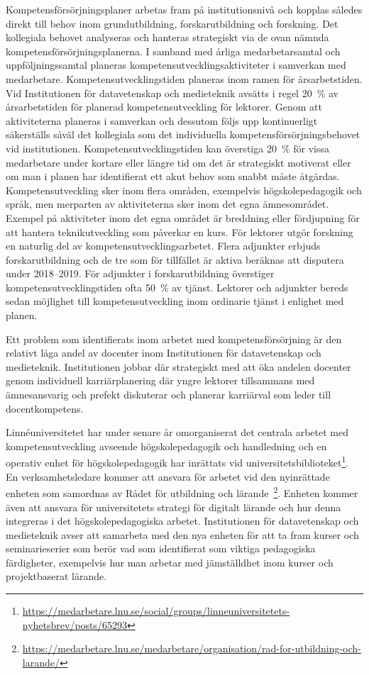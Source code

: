 Kompetensförsörjningsplaner arbetas fram på institutionsnivå och kopplas således direkt till behov inom grundutbildning, forskarutbildning och forskning. Det kollegiala behovet analyseras och hanteras strategiskt via de ovan nämnda kompetensförsörjningsplanerna. I samband med årliga medarbetarsamtal och uppföljningssamtal planeras kompetensutvecklingsaktiviteter i samverkan med medarbetare. Kompetensutvecklingstiden planeras inom ramen för årsarbetstiden. Vid Institutionen för datavetenskap och medieteknik avsätts i regel 20~\% av årsarbetstiden för planerad kompetensutveckling för lektorer. Genom att aktiviteterna planeras i samverkan och dessutom följs upp kontinuerligt säkerställs såväl det kollegiala som det individuella kompetensförsörjningsbehovet vid institutionen. Kompetensutvecklingstiden kan överstiga 20~\% för vissa medarbetare under kortare eller längre tid om det är strategiskt motiverat eller om man i planen har identifierat ett akut behov som snabbt måste åtgärdas. Kompetensutveckling sker inom flera områden, exempelvis högskolepedagogik och språk, men merparten av aktiviteterna sker inom det egna ämnesområdet. Exempel på aktiviteter inom det egna området är breddning eller fördjupning för att hantera teknikutveckling som påverkar en kurs. För lektorer utgör forskning en naturlig del av kompetensutvecklingsarbetet. Flera adjunkter erbjuds forskarutbildning och de tre som för tillfället är aktiva beräknas att disputera under 2018–2019. För adjunkter i forskarutbildning överstiger kompetensutvecklingstiden ofta 50~\% av tjänst. Lektorer och adjunkter bereds sedan möjlighet till kompetensutveckling inom ordinarie tjänst i enlighet med planen.

Ett problem som identifierats inom arbetet med kompetensförsörjning är den relativt låga andel av docenter inom Institutionen för datavetenskap och medieteknik. Institutionen jobbar där strategiskt med att öka andelen docenter genom individuell karriärplanering där yngre lektorer tillsammans med ämnesansvarig och prefekt diskuterar och planerar karriärval som leder till docentkompetens.

Linnéuniversitetet har under senare år omorganiserat det centrala arbetet med kompetensutveckling avseende högskolepedagogik och handledning och en operativ enhet för högskolepedagogik har inrättats vid universitetsbiblioteket\footnote{\url{https://medarbetare.lnu.se/social/groups/linneuniversitetets-nyhetsbrev/posts/65293}}. En verksamhetsledare kommer att ansvara för arbetet vid den nyinrättade enheten som samordnas av Rådet för utbildning och lärande~\footnote{\url{https://medarbetare.lnu.se/medarbetare/organisation/rad-for-utbildning-och-larande/}}. Enheten kommer även att ansvara för universitetets strategi för digitalt lärande och hur denna integreras i det högskolepedagogiska arbetet. Institutionen för datavetenskap och medieteknik avser att samarbeta med den nya enheten för att ta fram kurser och seminarieserier som berör vad som identifierat som viktiga pedagogiska färdigheter, exempelvis hur man arbetar med jämställdhet inom kurser och projektbaserat lärande.

